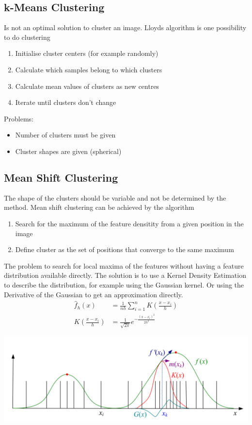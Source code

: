 \documentclass[x11names,11pt,a4paper]{article}
\theoremstyle{definition}
\begin{document}
\subsection{k-Means Clustering}
Is not an optimal solution to cluster an image. Lloyds algorithm is one possibility to do clustering
\begin{enumerate}
	\item[-\ ] Initialise cluster centers (for example randomly)
	\item Calculate which samples belong to which clusters
	\item Calculate mean values of clusters as new centres
	\item[-\ ] Iterate until clusters don't change
\end{enumerate}
Problems:
\begin{itemize}
	\item Number of clusters must be given
	\item Cluster shapes are given (spherical)
\end{itemize}

\subsection{Mean Shift Clustering}
The shape of the clusters should be variable and not be determined by the method. Mean shift clustering can be achieved by the algorithm
\begin{enumerate}
	\item Search for the maximum of the feature densitity from a given position in the image
	\item Define cluster as the set of positions that converge to the same maximum
\end{enumerate}
The problem to search for local maxima of the features without having a feature distribution available directly. The solution is to use a Kernel Density Estimation to describe the distribution, for example using the Gaussian kernel. Or using the Derivative of the Gaussian to get an approximation directly.
\begin{align*}
	\hat{f}_h(x) &= \frac{1}{nh}\sum_{i=1}^{n}K\left(\frac{x-x_i}{h}\right)\\
	K\left(\frac{x-x_i}{h}\right) &= \frac{1}{\sqrt{2\pi}} e^{-\frac{(x-x_i)^2}{2h^2}}
\end{align*}
\begin{center}
	\includegraphics[width=0.7\linewidth]{img/kernel_density_estimation}
\end{center}
\end{document}
